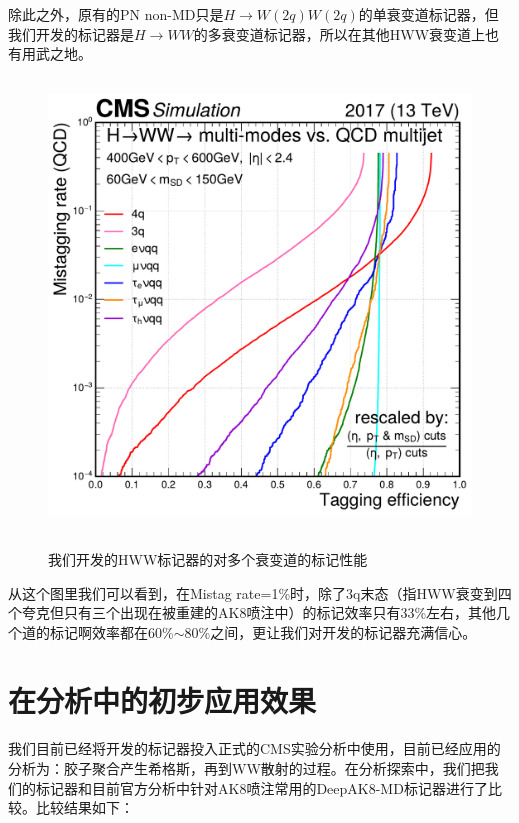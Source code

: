 除此之外，原有的PN non-MD只是$H\to W(2q)W(2q)$的单衰变道标记器，但我们开发的标记器是$H\to WW$的多衰变道标记器，所以在其他HWW衰变道上也有用武之地。
\begin{figure}[H]
 \centering
 \caption{我们开发的HWW标记器的对多个衰变道的标记性能}
 \includegraphics[height=12cm, width=12cm]{pictures/ROC_multi-modes_PKU_std.pdf}
 \label{fig:5.5}
\end{figure}
从这个图里我们可以看到，在Mistag rate=1\%时，除了3q末态（指HWW衰变到四个夸克但只有三个出现在被重建的AK8喷注中）的标记效率只有33\%左右，其他几个道的标记啊效率都在60\%$\sim$80\%之间，更让我们对开发的标记器充满信心。
\section{在分析中的初步应用效果}
我们目前已经将开发的标记器投入正式的CMS实验分析中使用，目前已经应用的分析为：胶子聚合产生希格斯，再到WW散射的过程。在分析探索中，我们把我们的标记器和目前官方分析中针对AK8喷注常用的DeepAK8-MD标记器进行了比较。比较结果如下：


